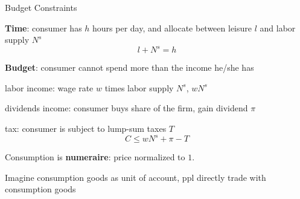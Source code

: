 \documentclass[11pt,aspectratio=169,usenames,dvipsnames]{beamer}
\let\tempone\itemize
\let\temptwo\enditemize
\renewenvironment{itemize}{\tempone\addtolength{\itemsep}{\fill}}{\temptwo}
\begin{document}
\begin{frame}{Budget Constraints}
\label{slide:Budget_Constraints}
    \begin{itemize}
        \item \textbf{Time}: consumer has $ h $ hours per day, and allocate between leisure $ l $ and labor supply $ N^{s} $
        \begin{equation}
        \label{eq:LaborTime}
            l + N^{s} = h
        \end{equation}
        \item \textbf{Budget}: consumer cannot spend more than the income he/she has
        \begin{itemize}
            \item \alert{labor income}: wage rate $ w $ times labor supply $ N^{s} $, $ wN^{s} $
            \item \alert{dividends income}: consumer buys share of the firm, gain dividend $ \pi $
            \item \alert{tax}: consumer is subject to lump-sum taxes $ T $
        \end{itemize}
        \begin{equation}
        \label{eq:budgetConstraint}
            C \le w N^{s} + \pi - T
        \end{equation}
        \item Consumption is \textbf{numeraire}: price \alert{normalized} to $ 1 $.
        \begin{itemize}
            \item Imagine consumption goods as \alert{unit of account}, ppl directly trade with consumption goods
        \end{itemize}
    \end{itemize}
\end{frame}
\end{document}
